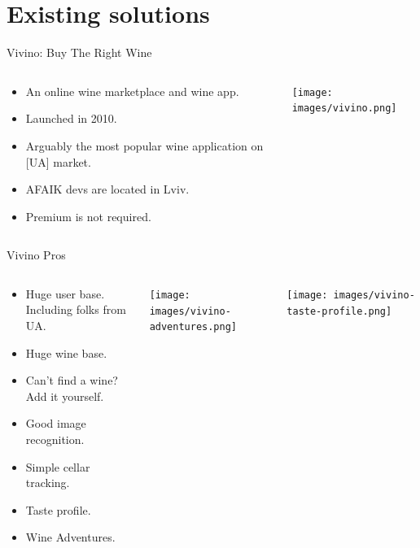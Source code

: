 \documentclass[presentation,aspectratio=169,smaller]{beamer}
\begin{document}
\section{Existing solutions}
\label{sec:orgb19199f}
\begin{frame}[label={sec:org5bb3e63}]{Vivino: Buy The Right Wine}
\begin{columns}
\begin{column}{0.6\columnwidth}
\begin{itemize}
\item An online wine marketplace and wine app.
\item Launched in 2010.
\item Arguably the most popular wine application on [UA] market.
\item AFAIK devs are located in Lviv.
\item Premium is not required.
\end{itemize}
\end{column}
\begin{column}{0.4\columnwidth}
\begin{center}
\texttt{[image: images/vivino.png]}
\end{center}
\end{column}
\end{columns}
\end{frame}
\begin{frame}[label={sec:org09f83c3}]{Vivino Pros}
\begin{columns}
\begin{column}{0.5\columnwidth}
\begin{itemize}
\item Huge user base. Including folks from UA.
\item Huge wine base.
\item Can't find a wine? Add it yourself.
\item Good image recognition.
\item Simple cellar tracking.
\item Taste profile.
\item Wine Adventures.
\end{itemize}
\end{column}
\begin{column}{0.25\columnwidth}
\begin{center}
\texttt{[image: images/vivino-adventures.png]}
\end{center}
\end{column}
\begin{column}{0.25\columnwidth}
\begin{center}
\texttt{[image: images/vivino-taste-profile.png]}
\end{center}
\end{column}
\end{columns}
\end{frame}
\end{document}

